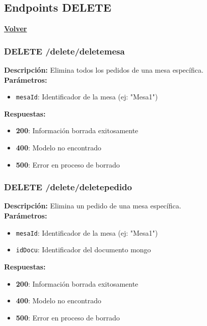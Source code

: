 \documentclass[12pt]{article}
\begin{document}
\clearpage

\subsection{Endpoints DELETE}
\hyperlink{anchor-indice}{\textbf{Volver}}\\

\subsubsection{DELETE /delete/deletemesa}
\textbf{Descripción:} Elimina todos los pedidos de una mesa específica.\\

\textbf{Parámetros:}
\begin{itemize}
    \item \texttt{mesaId}: Identificador de la mesa (ej: "Mesa1")
\end{itemize}

\textbf{Respuestas:}
\begin{itemize}
    \item \textbf{200}: Información borrada exitosamente
    \item \textbf{400}: Modelo no encontrado
    \item \textbf{500}: Error en proceso de borrado
\end{itemize}

\clearpage

\subsubsection{DELETE /delete/deletepedido}
\textbf{Descripción:} Elimina un pedido de una mesa específica.\\

\textbf{Parámetros:}
\begin{itemize}
    \item \texttt{mesaId}: Identificador de la mesa (ej: "Mesa1")
    \item \texttt{idDocu}: Identificador del documento mongo
\end{itemize}

\textbf{Respuestas:}
\begin{itemize}
    \item \textbf{200}: Información borrada exitosamente
    \item \textbf{400}: Modelo no encontrado
    \item \textbf{500}: Error en proceso de borrado
\end{itemize}
\end{document}

